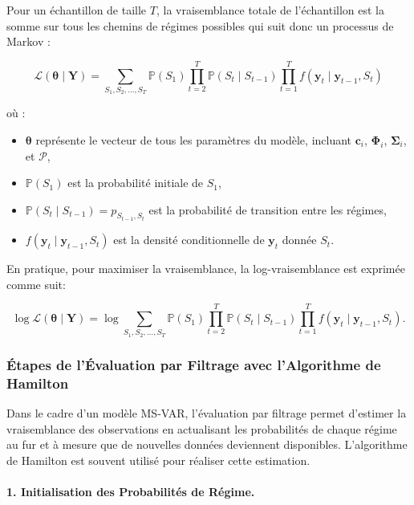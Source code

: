 \begin{sloppypar}
Pour un échantillon de taille \( T \), la vraisemblance totale de l'échantillon est la somme sur tous les chemins de régimes possibles qui suit donc un processus de Markov :

\begin{equation}
\mathcal{L}(\bm{\theta} \mid \bm{Y}) = \sum_{S_1, S_2, \dots, S_T} \mathbb{P}(S_1) \prod_{t=2}^T \mathbb{P}(S_t \mid S_{t-1}) \prod_{t=1}^T f(\bm{y}_t \mid \bm{y}_{t-1}, S_t)
\end{equation}

où :
\begin{itemize}
    \item \( \bm{\theta} \) représente le vecteur de tous les paramètres du modèle, incluant \( \bm{c}_i \), \( \bm{\Phi}_i \), \( \bm{\Sigma}_i \), et \( \mathcal{P} \),
    \item \( \mathbb{P}(S_1) \) est la probabilité initiale de \( S_1 \),
    \item \( \mathbb{P}(S_t \mid S_{t-1}) = p_{S_{t-1}, S_t} \) est la probabilité de transition entre les régimes,
    \item \( f(\bm{y}_t \mid \bm{y}_{t-1}, S_t) \) est la densité conditionnelle de \( \bm{y}_t \) donnée \( S_t \).
\end{itemize}

En pratique, pour maximiser la vraisemblance, la log-vraisemblance est exprimée comme suit: 

\begin{equation}
   \log \mathcal{L}(\bm{\theta} \mid \bm{Y}) = \log \sum_{S_1, S_2, \dots, S_T} \mathbb{P}(S_1) \prod_{t=2}^T \mathbb{P}(S_t \mid S_{t-1}) \prod_{t=1}^T f(\bm{y}_t \mid \bm{y}_{t-1}, S_t). 
\end{equation}

\subsubsection{Étapes de l'Évaluation par Filtrage avec l'Algorithme de Hamilton}

Dans le cadre d'un modèle MS-VAR, l'évaluation par filtrage permet d'estimer la vraisemblance des observations en actualisant les probabilités de chaque régime au fur et à mesure que de nouvelles données deviennent disponibles. L'algorithme de Hamilton est souvent utilisé pour réaliser cette estimation.

\paragraph{1. Initialisation des Probabilités de Régime.}


\end{sloppypar}
